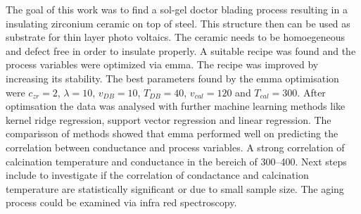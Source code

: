 The goal of this work was to find a sol-gel doctor blading process resulting in a insulating zirconium ceramic on top of steel.
This structure then can be used as substrate for thin layer photo voltaics. 
The ceramic needs to be homoegeneous and defect free in order to insulate properly.
A suitable recipe was found\cite{Hu2016} and the process variables were optimized via \gls{emma}. 
The recipe was improved by increasing its stability. 
The best parameters found by the emma optimisation were 
$c_{zr}=2$, $\lambda=10$, $v_{DB}=10$, $T_{DB}=40$, $v_{cal}=120$ and $T_{cal}=300$.
After optimsation the data was analysed with further machine learning methods like kernel ridge regression, support vector regression and linear regression. 
The comparisson of methods showed that \gls{emma} performed well on predicting the correlation between conductance and process variables. 
A strong correlation of calcination temperature and conductance in the bereich of 300--400\oc{}. 
Next steps include to investigate if the correlation of condactance and calcination temperature are statistically significant or due to small sample size. 
The aging process could be examined via infra red spectroscopy. 
\iffalse
was kann noch veraendert werden? 
humidity 
solution age
vdb and tdb on g and phd 
Tcal on g and phd 

Making of the solution for the sol-gel process:
For a single concentrated solution \ml{0.05} of \gls{zrpro} are added while stirring to \ml{4.95} of \gls{buoh} and stirred for \minutes{15}. 
\ml{0.013} (or one molar equvilent of Zr) of \gls{acac} is added to the stirring solution. 
After another \minutes{15} \ml{1} of acetic acid is added and stirred for \minutes{30} to stabilize the solution up to \h{24}. 

The concentration can be increased up to 5 times being stable for a minimum of \h{4}. 
The sol-gel process produces am homogeneous transparent crystalline zirconia oxide layer. 
homogeneity can be mainly controlled via blade velocity and temperature and layers can be stacked.

It should have been also verglichen with grid search with comparable size
but most time was used to find a vernuenfig base recipe and process

It is still very human 
Der process is - as it the case with all ML and most fitting processes - is very abhaengig von hyper parameters, 
In the current work population size, number of generations, and most importantly boundaries (grenzen). 
\fi

